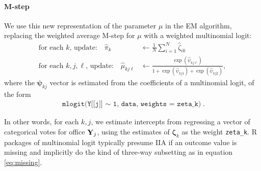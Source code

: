 \documentclass[11pt]{article}
\begin{document}
\paragraph{M-step} We use this new representation of the parameter \(\mu\) in the EM algorithm, replacing the weighted average M-step for \(\mu\) with a weighted multinomial logit:
\begin{align}
\text{for each \(k\), update: }~~~  \widehat{\pi}_{k} &\leftarrow \frac{1}{N}\sum^N_{i = 1}\widehat{\zeta}_{ik} \label{eq:Mstep_IIA_theta} \\
\text{for each \(k, j, \ell\), update: }~~~ \widehat{\mu}_{kj\ell} &\leftarrow  \frac{\exp\left(\widehat\psi_{kj\ell}\right)}{1 + \exp\left(\widehat\psi_{kj1}\right) + \exp\left(\widehat\psi_{kj2}\right)} \label{eq:Mstep_IIA_mu},
\end{align}
where the \(\bm\psi_{kj}\) vector is estimated from the coefficients of a multinomial logit, of the form
\begin{align*}
\texttt{mlogit(Y[[j]] \(\sim\) 1, data, weights = zeta\_k)}.
\end{align*}

In other words, for each \(k, j\), we estimate intercepts from regressing a vector of categorical votes for office \(\mathbf{Y}_{j}\), using the estimates of \(\bm{\zeta}_{k}\) as the weight \texttt{zeta\_k}. R packages of multinomial logit typically presume IIA if an outcome value is missing and implicitly do the kind of three-way subsetting as in equation \ref{eq:missing}. 
\end{document}
